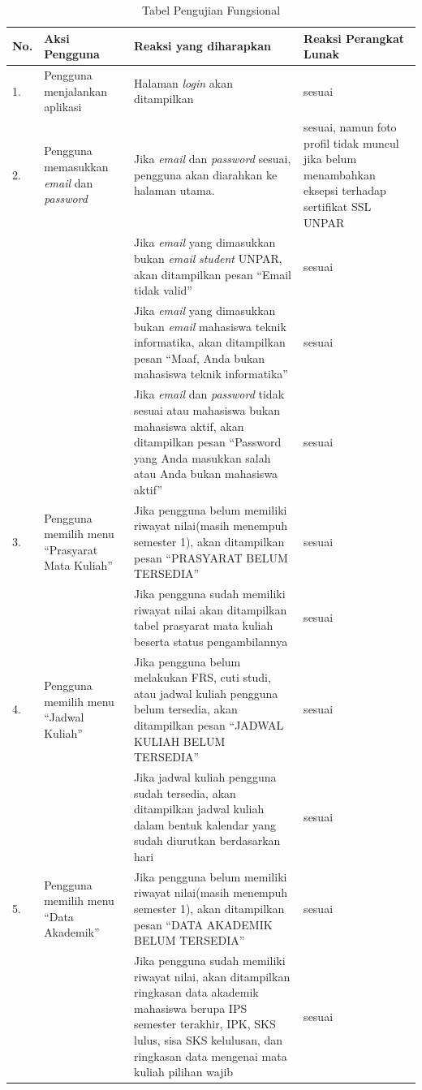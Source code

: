 			\begin{table}[H]
			\centering
			\caption{Tabel Pengujian Fungsional}
				\begin{tabular}{|p{0.25cm}| p{3.5cm}| p{7cm}| p{2.5cm}|} \hline
				No.	&	Aksi Pengguna	&	Reaksi yang diharapkan	&	Reaksi Perangkat Lunak \\ \hline
				1.	&	Pengguna menjalankan aplikasi	&	Halaman \textit{login} akan ditampilkan	&	sesuai	\\ \hline
				2.	&	Pengguna memasukkan \textit{email} dan \textit{password}	&	Jika \textit{email} dan \textit{password}	sesuai, pengguna akan diarahkan ke halaman utama. & sesuai, namun foto profil tidak muncul jika belum menambahkan eksepsi terhadap sertifikat SSL UNPAR\\ \hline
					&	&	Jika \textit{email} yang dimasukkan bukan \textit{email} \textit{student} UNPAR, akan ditampilkan pesan ``Email tidak valid''&	sesuai	\\ \hline
					&	&	Jika \textit{email} yang dimasukkan bukan \textit{email} mahasiswa teknik informatika, akan ditampilkan pesan ``Maaf, Anda bukan mahasiswa teknik informatika''	&	sesuai	\\ \hline
					&	&	Jika \textit{email} dan \textit{password} tidak sesuai atau mahasiswa bukan mahasiswa aktif, akan ditampilkan pesan ``Password yang Anda masukkan salah atau Anda bukan mahasiswa aktif''	&	sesuai	\\ \hline
				3.	&	Pengguna memilih menu ``Prasyarat Mata Kuliah'' &	Jika pengguna belum memiliki riwayat nilai(masih menempuh semester 1), akan ditampilkan pesan ``PRASYARAT BELUM TERSEDIA''	&	sesuai	\\ \hline
					&	&	Jika pengguna sudah memiliki riwayat nilai	akan ditampilkan tabel prasyarat mata kuliah beserta status pengambilannya &	sesuai	\\ \hline
				4.	&	Pengguna memilih menu ``Jadwal Kuliah'' &	Jika pengguna belum melakukan FRS, cuti studi, atau jadwal kuliah pengguna belum tersedia, akan ditampilkan pesan ``JADWAL KULIAH BELUM TERSEDIA''	&	sesuai	\\ \hline
					&	&	Jika jadwal kuliah pengguna sudah tersedia, akan ditampilkan jadwal kuliah dalam bentuk kalendar yang sudah diurutkan berdasarkan hari &	sesuai	\\ \hline
				5.	&	Pengguna memilih menu ``Data Akademik'' &	Jika pengguna belum memiliki riwayat nilai(masih menempuh semester 1), akan ditampilkan pesan ``DATA AKADEMIK BELUM TERSEDIA'' &	sesuai	\\ \hline
					&	&	Jika pengguna sudah memiliki riwayat nilai, akan ditampilkan ringkasan data akademik mahasiswa berupa IPS semester terakhir, IPK, SKS lulus, sisa SKS kelulusan, dan ringkasan data mengenai mata kuliah pilihan wajib &	sesuai	\\ \hline

\end{tabular}
\end{table}
